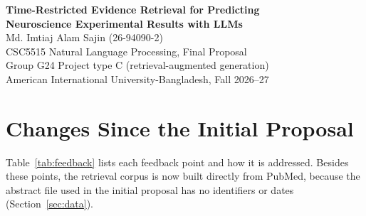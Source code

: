 \documentclass[10pt,a4paper]{article}
\begin{document}
\begin{center}
{\large\bfseries Time-Restricted Evidence Retrieval for Predicting\\ Neuroscience Experimental Results with LLMs}\\[5pt]
Md. Imtiaj Alam Sajin (26-94090-2)\\[1pt]
CSC5515 Natural Language Processing, Final Proposal\\[1pt]
Group G24 \quad Project type C (retrieval-augmented generation)\\[1pt]
American International University-Bangladesh, Fall 2026--27
\end{center}

\section{Changes Since the Initial Proposal}
Table~\ref{tab:feedback} lists each feedback point and how it is addressed. Besides these points, the retrieval corpus is now built directly from PubMed, because the abstract file used in the initial proposal has no identifiers or dates (Section~\ref{sec:data}).
\end{document}
